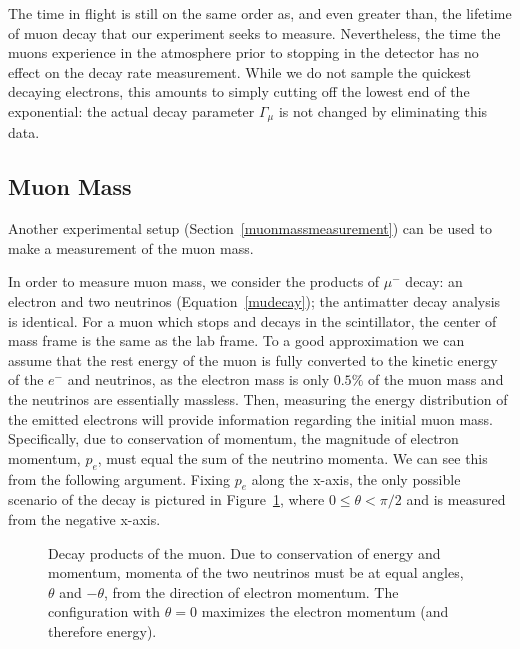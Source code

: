 The time in flight is still on the same order as, and even greater
than, the lifetime of muon decay that our experiment seeks to
measure. Nevertheless, the time the muons experience in the atmosphere
prior to stopping in the detector has no effect on the decay rate
measurement. While we do not sample the quickest decaying electrons,
this amounts to simply cutting off the lowest end of the exponential: the actual
decay parameter $\Gamma_{\mu}$ is not changed by eliminating this data.


\subsection{Muon Mass}\label{muonmass}

Another experimental setup (Section~\ref{muonmassmeasurement}) can be
used to make a measurement of the muon mass.

In order to measure muon mass, we consider the products of $\mu^-$
decay: an electron and two neutrinos (Equation~\eqref{mudecay}); the
antimatter decay analysis is identical. For a muon which stops and
decays in the scintillator, the center of mass frame is the same as
the lab frame. To a good approximation we can assume that the rest
energy of the muon is fully converted to the kinetic energy of the
$e^-$ and neutrinos, as the electron mass is only $0.5\%$ of the muon
mass and the neutrinos are essentially massless. Then, measuring the
energy distribution of the emitted electrons will provide information
regarding the initial muon mass. Specifically, due to conservation of
momentum, the magnitude of electron momentum, $p_e$, must equal the
sum of the neutrino momenta. We can see this from the following
argument. Fixing $p_e$ along the x-axis, the only possible scenario of
the decay is pictured in Figure~\ref{figure:e_nu}, where $0 \leq
\theta <\pi/2$ and is measured from the negative x-axis.

\begin{figure}[ht]
\begin{center}

\caption{\small{Decay products of the muon. Due to conservation of
energy and momentum, momenta of the two neutrinos must be at equal
angles, $\theta$ and $-\theta$, from the direction of electron
momentum. The configuration with $\theta = 0$ maximizes the electron
momentum (and therefore energy).}}
\label{figure:e_nu}
\end{center}
\end{figure}

